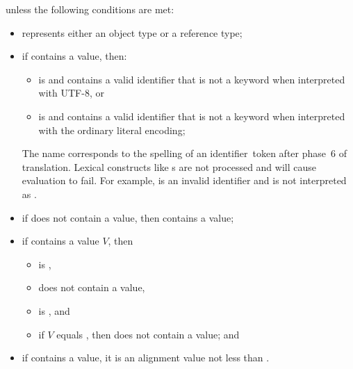 \begin{itemdescr}
\pnum
\throws
{} unless the following conditions are met:
\begin{itemize}
\item
   represents either an object type or a reference type;
\item
  if  contains a value, then:
  \begin{itemize}
  \item
     is 
    and 
    contains a valid identifier
    that is not a keyword
    when interpreted with UTF-8, or
  \item
     is 
    and 
    contains a valid identifier
    that is not a keyword
    when interpreted with the ordinary literal encoding;
  \end{itemize}
  \begin{note}
  The name corresponds to the spelling of an identifier~token
  after phase~6 of translation.
  Lexical constructs like
  s are not processed
  and will cause evaluation to fail.
  For example,  is an invalid identifier
  and is not interpreted as .
  \end{note}
\item
  if  does not contain a value,
  then  contains a value;
\item
  if  contains a value $V$, then
  \begin{itemize}
  \item
     is ,
  \item
     does not contain a value,
  \item
     is , and
  \item
    if $V$ equals ,
    then  does not contain a value; and
  \end{itemize}
  \item
    if  contains a value,
    it is an alignment value
    not less than .
\end{itemize}
\end{itemdescr}

